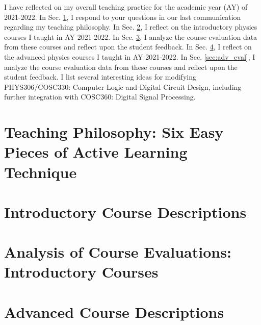 \documentclass[../../main.tex]{subfiles}
\begin{document}
\label{sec:teaching}

I have reflected on my overall teaching practice for the academic year (AY) of 2021-2022.  In Sec. \ref{sec:teaching_philosophy}, I respond to your questions in our last communication regarding my teaching philosophy.  In Sec. \ref{sec:intro}, I reflect on the introductory physics courses I taught in AY 2021-2022.  In Sec. \ref{sec:intro_eval}, I analyze the course evaluation data from these courses and reflect upon the student feedback.  In Sec. \ref{sec:adv}, I reflect on the advanced physics courses I taught in AY 2021-2022.  In Sec. \ref{sec:adv_eval}, I analyze the course evaluation data from these courses and reflect upon the student feedback.  I list several interesting ideas for modifying PHYS306/COSC330: Computer Logic and Digital Circuit Design, including further integration with COSC360: Digital Signal Processing.

\section{Teaching Philosophy: Six Easy Pieces of Active Learning Technique}
\label{sec:teaching_philosophy}

\begin{flushleft}

\end{flushleft}

\section{Introductory Course Descriptions}
\label{sec:intro}

\begin{flushleft}

\end{flushleft}

\section{Analysis of Course Evaluations: Introductory Courses}
\label{sec:intro_eval}

\begin{flushleft}

\end{flushleft}

\section{Advanced Course Descriptions}
\label{sec:adv}
\end{document}
